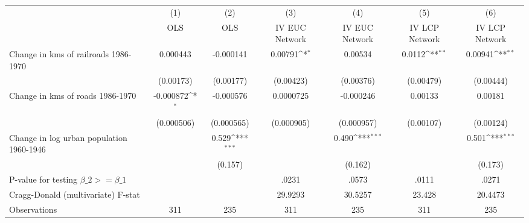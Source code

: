 {
\def\sym#1{\ifmmode^{#1}\else\(^{#1}\)\fi}
\begin{tabular}{l*{6}{c}}
\hline\hline
                &\multicolumn{1}{c}{(1)}&\multicolumn{1}{c}{(2)}&\multicolumn{1}{c}{(3)}&\multicolumn{1}{c}{(4)}&\multicolumn{1}{c}{(5)}&\multicolumn{1}{c}{(6)}\\
                &\multicolumn{1}{c}{OLS}&\multicolumn{1}{c}{OLS}&\multicolumn{1}{c}{IV EUC Network}&\multicolumn{1}{c}{IV EUC Network}&\multicolumn{1}{c}{IV LCP Network}&\multicolumn{1}{c}{IV LCP Network}\\
\hline
Change in kms of railroads 1986-1970& 0.000443         &-0.000141         &  0.00791\sym{*}  &  0.00534         &   0.0112\sym{**} &  0.00941\sym{**} \\
                &(0.00173)         &(0.00177)         &(0.00423)         &(0.00376)         &(0.00479)         &(0.00444)         \\
[1em]
Change in kms of roads 1986-1970&-0.000872\sym{*}  &-0.000576         &0.0000725         &-0.000246         &  0.00133         &  0.00181         \\
                &(0.000506)         &(0.000565)         &(0.000905)         &(0.000957)         &(0.00107)         &(0.00124)         \\
[1em]
Change in log urban population 1960-1946&                  &    0.529\sym{***}&                  &    0.490\sym{***}&                  &    0.501\sym{***}\\
                &                  &  (0.157)         &                  &  (0.162)         &                  &  (0.173)         \\
\hline
P-value for testing $\beta\_{2} >= \beta\_{1}$&                  &                  &    .0231         &    .0573         &    .0111         &    .0271         \\
Cragg-Donald (multivariate) F-stat&                  &                  &  29.9293         &  30.5257         &   23.428         &  20.4473         \\
Observations    &      311         &      235         &      311         &      235         &      311         &      235         \\
\hline\hline
\end{tabular}
}

